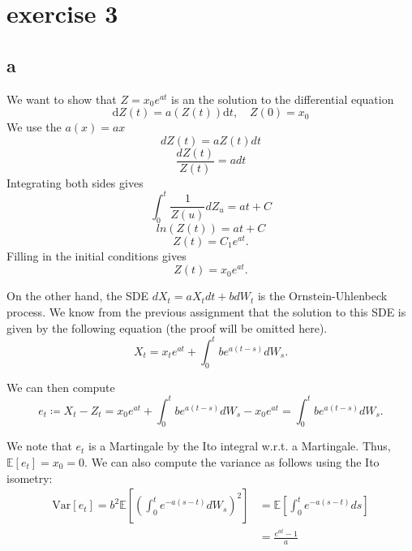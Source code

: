 \documentclass[a4paper,12pt]{article} %
\newcommand{\Var}{\mathrm{Var}}
\begin{document}
\section{exercise 3}
\subsection{a}
We want to show that $Z=x_0 e^{at}$ is an the solution to the differential equation $$\mathrm{d}Z(t)= a(Z(t))\mathrm{d}t, \quad Z(0)=x_0$$
We use the $a(x)=ax$
$$dZ(t)= a Z(t) dt $$
$$\frac{dZ(t)}{Z(t)}=adt$$
Integrating both sides gives $$\int_0^t\frac{1}{Z(u)}dZ_u= at+C$$
$$ln(Z(t))=at+C$$
$$Z(t)= C_{1}e^ {at}.$$
Filling in the initial conditions gives $$Z(t)=x_0 e^{at}.$$

On the other hand, the SDE \(dX_t = aX_t dt +bdW_t\) is the Ornstein-Uhlenbeck process. We know from the previous assignment that the solution to this SDE is given by the following equation (the proof will be omitted here).
\begin{equation}
    X_t = x_t e^{at} + \int_0^t b e^{a(t-s)}dW_s.
\end{equation}

We can then compute
\begin{equation}
    e_t \coloneqq X_t -Z_t = x_0 e^{at} + \int_0^t b e^{a(t-s)}dW_s - x_0 e^{at} = \int_0^t b e^{a(t-s)}dW_s.
\end{equation}

We note that \(e_t\) is a Martingale by the Ito integral w.r.t. a Martingale. Thus, \(\mathbb{E} \left[ e_t \right] = x_0=0\).
We can also compute the variance as follows using the Ito isometry:
\begin{align}
    \Var\left[e_t \right] = b^2 \mathbb{E} \left[ \left( \int _0^t e^{-a(s-t)}dW_s \right)^{2}   \right] & = \mathbb{E} \left[ \int _0^t e^{-a(s-t)}ds \right] \\
                                                                                                         & = \frac{e^{at} -1}{a}
\end{align}
\end{document}
